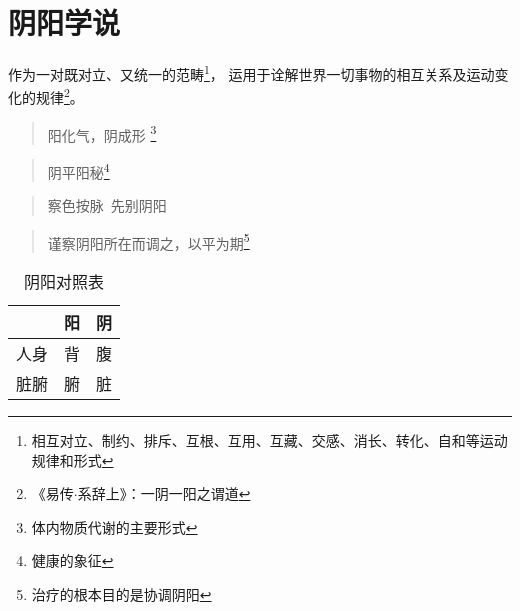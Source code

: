 \section{阴阳学说}
作为一对既对立、又统一的范畴\footnote{相互对立、制约、排斥、互根、互用、互藏、交感、消长、转化、自和等运动规律和形式}，
运用于诠解世界一切事物的相互关系及运动变化的规律\footnote{《易传$\cdot$系辞上》：一阴一阳之谓道}。

\begin{quote}
  阳化气，阴成形 \footnote{体内物质代谢的主要形式}
\end{quote}
\begin{quote}
  阴平阳秘\footnote{健康的象征}
\end{quote}
\begin{quote}
  察色按脉\ 先别阴阳
\end{quote}
\begin{quote}
  谨察阴阳所在而调之，以平为期\footnote{治疗的根本目的是协调阴阳}
\end{quote}

\begin{table}[H]
  \centering
  \caption[]{阴阳对照表}
  \begin{tabular}{|c|c|c|}
    \hline & 阳 & 阴 \\
    \hline 人身 & 背 & 腹 \\
    \hline 脏腑 & 腑 & 脏\\
    \hline
  \end{tabular}
\end{table}
